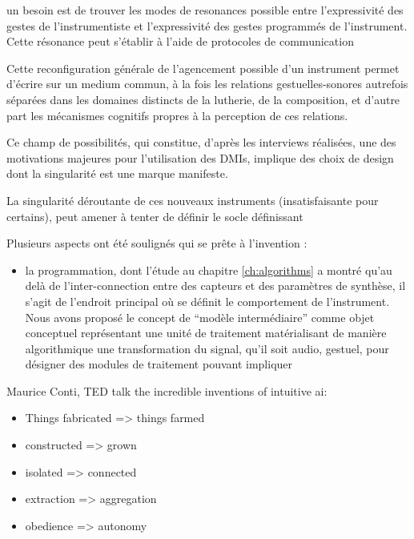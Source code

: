 un besoin est de trouver les modes de resonances possible entre l'expressivité des gestes de l'instrumentiste et l'expressivité des gestes programmés de l'instrument. Cette résonance peut s'établir à l'aide de protocoles de communication 

Cette reconfiguration générale de l'agencement possible d'un instrument permet d'écrire sur un medium commun, à la fois les relations gestuelles-sonores autrefois séparées dans les domaines distincts de la lutherie, de la composition, et d'autre part les mécanismes cognitifs propres à la perception de ces relations.


Ce champ de possibilités, qui constitue, d'après les interviews réalisées, une des motivations majeures pour l'utilisation des \glspl{DMI}, implique des choix de design dont la singularité est une marque manifeste. 

La singularité déroutante de ces nouveaux instruments (insatisfaisante pour certains), peut amener à tenter de définir le socle définissant



Plusieurs aspects ont été soulignés qui se prête à l'invention : 
\vspace{-1em}
\begin{itemize}[noitemsep]
	\item la programmation, dont l'étude au chapitre \ref{ch:algorithms} a montré qu'au delà de l'inter-connection entre des capteurs et des paramètres de synthèse, il s'agit de l'endroit principal où se définit le comportement de l'instrument. Nous avons proposé le concept de ``modèle intermédiaire'' comme objet conceptuel représentant une unité de traitement matérialisant de manière algorithmique une transformation du signal, qu'il soit audio, gestuel, pour désigner des modules de traitement pouvant impliquer 
\end{itemize}

Maurice Conti, TED talk the incredible inventions of intuitive ai:
\vspace{-1em}
\begin{itemize}[noitemsep]
	\item Things fabricated => things farmed
	\item constructed => grown
	\item isolated => connected
	\item extraction => aggregation
	\item obedience => autonomy
\end{itemize}


